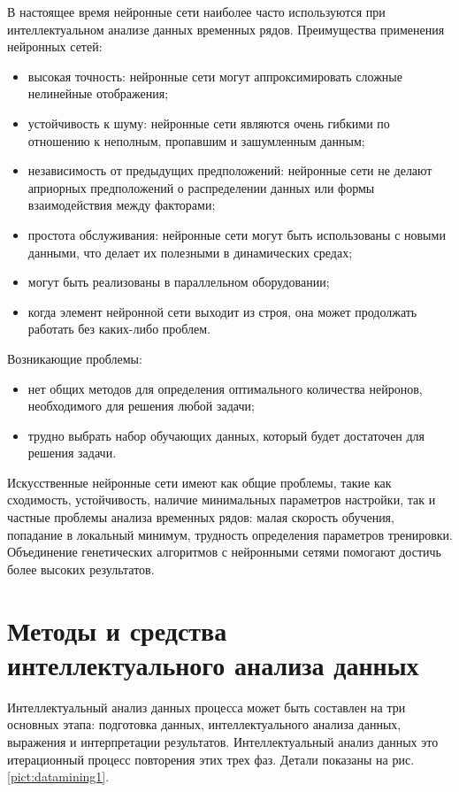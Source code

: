 В настоящее время нейронные сети наиболее часто используются при интеллектуальном анализе данных
временных рядов. 
Преимущества применения нейронных сетей:
\begin{itemize}
	\item высокая точность: нейронные сети могут аппроксимировать сложные нелинейные отображения;
	\item устойчивость к шуму: нейронные сети являются очень гибкими по отношению к неполным, пропавшим и зашумленным данным;
	\item независимость от предыдущих предположений: нейронные сети не делают априорных предположений о 
	распределении данных или формы взаимодействия между факторами;
	\item простота обслуживания: нейронные сети могут быть использованы с новыми данными, что делает их полезными в динамических средах;
	\item могут быть реализованы в параллельном оборудовании;
	\item когда элемент нейронной сети выходит из строя, она может продолжать работать без каких-либо проблем.
\end{itemize}

Возникающие проблемы:
\begin{itemize}
 \item нет общих методов для определения оптимального количества нейронов, необходимого для решения любой задачи;
 \item трудно выбрать набор обучающих данных, который будет достаточен для решения задачи.
\end{itemize}

Искусственные нейронные сети имеют как общие проблемы, такие как сходимость, устойчивость, наличие минимальных параметров настройки, так и частные проблемы анализа временных рядов: малая скорость обучения, попадание в локальный минимум, трудность определения параметров тренировки.
Объединение генетических алгоритмов с нейронными сетями помогают достичь более высоких результатов.

\section{Методы и средства интеллектуального анализа данных}

Интеллектуальный анализ данных процесса может быть составлен на три основных этапа:
подготовка данных, интеллектуального анализа данных, выражения и интерпретации
результатов. Интеллектуальный анализ данных это итерационный процесс повторения этих трех фаз. 
Детали показаны на рис. \ref{pict:datamining1}.

